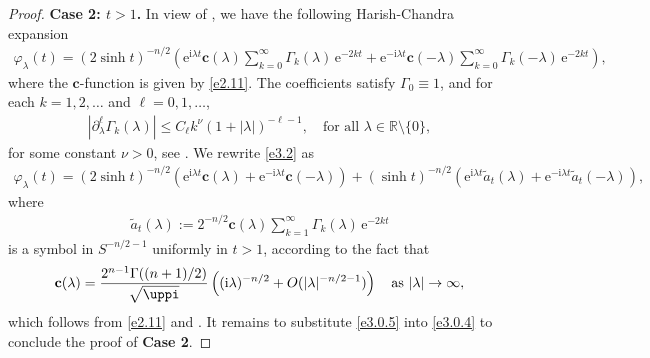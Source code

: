 \documentclass[a4paper,12pt]{amsart}
\numberwithin{equation}{section}
\theoremstyle{definition}
\theoremstyle{remark}
\numberwithin{theorem}{section}
\newcommand{\R}{\mathbb{R}}
\newcommand{\e}{\mathrm{e}}
\newcommand{\bc}{\mathbf{c}}
\renewcommand{\i}{\mathrm{i}}
\begin{document}
\begin{proof}
\noindent\textbf{Case 2: $t>1$.} In view of \cite[(8) and (10)]{AnPiVa}, we have the following Harish-Chandra expansion
\begin{align}\label{e3.2}
\varphi_\lambda(t)=(2\sinh t)^{-n/2}\left(\e^{\i\lambda t}\bc(\lambda)\sum_{k=0}^\infty \Gamma_k(\lambda)\,\e^{-2kt}+\e^{-\i\lambda t}\bc(-\lambda)\sum_{k=0}^\infty \Gamma_k(-\lambda)\,\e^{-2k t}\right),
\end{align}
where the $\bc$-function is given by \eqref{e2.11}. The coefficients satisfy $\Gamma_0\equiv 1$, and for each $k=1,2,\dots$ and $\ell=0,1,\dots$,
\begin{align*}
|\partial^\ell_\lambda \Gamma_k(\lambda)|\leq C_\ell k^\nu (1+|\lambda|)^{-\ell-1},\quad\mbox{for all }\lambda\in\R\setminus \{0\},
\end{align*}
for some constant $\nu>0$, see \cite[Lemma 2.1]{AnPiVa}. We rewrite \eqref{e3.2} as
\begin{align}\label{e3.0.4}
\varphi_\lambda(t)=(2\sinh t)^{-n/2}\left(\e^{\i\lambda t}\bc(\lambda)+\e^{-\i\lambda t}\bc(-\lambda)\right)+(\sinh t)^{-n/2}\left(\e^{\i\lambda t}\widetilde{a}_t(\lambda)+\e^{-\i\lambda t}\widetilde{a}_t(-\lambda)\right),
\end{align}
where
\begin{align*}
\widetilde{a}_t(\lambda):=2^{-n/2}\bc(\lambda)\sum_{k=1}^\infty \Gamma_k(\lambda)\,\e^{-2kt}
\end{align*}
is a symbol in $S^{-n/2-1}$ uniformly in $t>1$, according to the fact that
\begin{align}\label{e3.0.5}
\bc(\lambda)={2^{n-1}\Gamma((n+1)/2)\over\sqrt{\uppi}}\left((\i\lambda)^{-n/2}+O(|\lambda|^{-n/2-1})\right)\quad\mbox{as }|\lambda|\to\infty,
\end{align}
which follows from \eqref{e2.11} and \cite[p. 47, (4)]{Er}. It remains to substitute \eqref{e3.0.5} into \eqref{e3.0.4} to conclude the proof of \textbf{Case 2}.


\end{proof}
\end{document}
